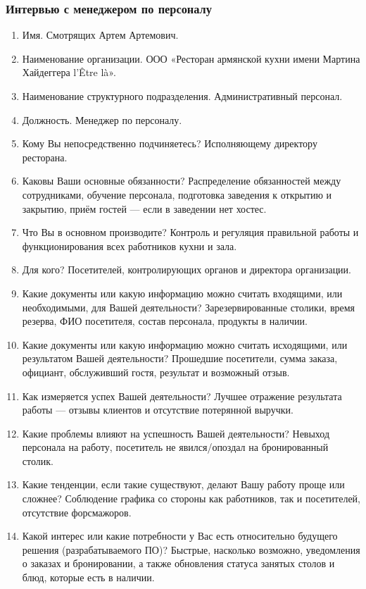 \subsubsection{Интервью с менеджером по персоналу}

\begin{enumerate}
	\item{Имя. Смотрящих Артем Артемович.}
	\item{Наименование организации. ООО «Ресторан армянской кухни имени Мартина Хайдеггера l’Être là».}
	\item{Наименование структурного подразделения. Административный персонал.}
	\item{Должность. Менеджер по персоналу.}
	\item{Кому Вы непосредственно подчиняетесь? Исполняющему директору ресторана.}
	\item{Каковы Ваши основные обязанности? Распределение обязанностей между сотрудниками, обучение персонала, подготовка заведения к открытию и закрытию, приём гостей --- если в заведении нет хостес.}
	\item{Что Вы в основном производите? Контроль и регуляция правильной работы и функционирования всех работников кухни и зала.}
	\item{Для кого? Посетителей, контролирующих органов и директора организации.}
	\item{Какие документы или какую информацию можно считать входящими, или необходимыми, для Вашей деятельности? Зарезервированные столики, время резерва, ФИО посетителя, состав персонала, продукты в наличии.}
	\item{ Какие документы или какую информацию можно считать исходящими, или результатом Вашей деятельности? Прошедшие посетители, сумма заказа, официант, обслуживший гостя, результат и возможный отзыв.}
	\item{ Как измеряется успех Вашей деятельности? Лучшее отражение результата работы --- отзывы клиентов и отсутствие потерянной выручки.}
	\item{ Какие проблемы влияют на успешность Вашей деятельности? Невыход персонала на работу, посетитель не явился/опоздал на бронированный столик.}
	\item{ Какие тенденции, если такие существуют, делают Вашу работу проще или сложнее? Соблюдение графика со стороны как работников, так и посетителей, отсутствие форс­мажоров.}
	\item{ Какой интерес или какие потребности у Вас есть относительно будущего решения (разрабатываемого ПО)? Быстрые, насколько возможно, уведомления о заказах и бронировании, а также обновления статуса занятых столов и блюд, которые есть в наличии.}
\end{enumerate}

